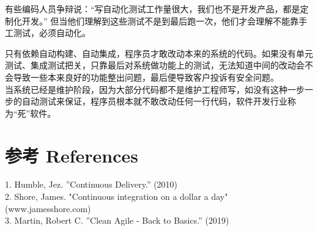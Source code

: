 有些编码人员争辩说：``写自动化测试工作量很大，我们也不是开发产品，都是定制化开发。''
但当他们理解到这些测试不是到最后跑一次，他们才会理解不能靠手工测试，必须自动化。

只有依赖自动构建、自动集成，程序员才敢改动本来的系统的代码。如果没有单元测试、集成测试把关，只靠最后对系统做功能上的测试，无法知道中间的改动会不会导致一些本来良好的功能整出问题，最后便导致客户投诉有安全问题。\\
当系统已经是维护阶段，因为大部分代码都不是维护工程师写，如没有这种一步一步的自动测试来保证，程序员根本就不敢改动任何一行代码，软件开发行业称为``死''软件。\\

\hypertarget{ux9644ux4ef6}{%
\section{参考 References}\label{ux9644ux4ef6}}

1. Humble, Jez. ''Continuous Delivery.'' (2010) \\
2. Shore, James. "Continuous integration on a dollar a day" (www.jamesshore.com)\\
3. Martin, Robert C. ''Clean Agile - Back to Basics.'' (2019)\\




